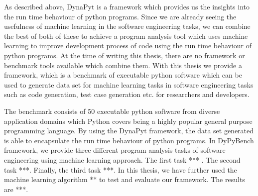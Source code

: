 As described above, DynaPyt is a framework which provides us the insights into the run time behaviour of python programs. Since we are already seeing the usefulness of machine learning in the software engineering tasks, we can combine the best of both of these to achieve a program analysis tool which uses machine learning to improve development process of code using the run time behaviour of python programs. At the time of writing this thesis, there are no framework or benchmark tools available which combine them. With this thesis we provide a framework,  which is a benchmark of executable python software which can be used to generate data set for machine learning tasks in software engineering tasks such as code generation, test case generation etc. for researchers and developers. 

The benchmark consists of 50 executable python software from diverse application domains which Python covers being a highly popular general purpose programming language. By using the DynaPyt framework, the data set generated is able to encapsulate the run time behaviour of python programs. In DyPyBench framework, we provide three different program analysis tasks of software engineering using machine learning approach. The first task *** . The second task ***. Finally, the third task ***. In this thesis, we have further used the machine learning algorithm ** to test and evaluate our framework. The results are ***. 
